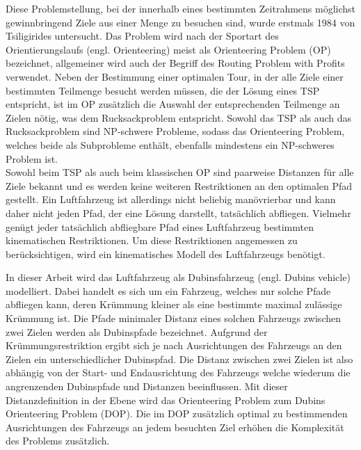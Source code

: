 \documentclass[12pt,a4paper,twoside]{article}
\theoremstyle{definition}
\numberwithin{equation}{section}
\begin{document}
Diese Problemstellung, bei der innerhalb eines bestimmten Zeitrahmens möglichst gewinnbringend Ziele aus einer Menge zu besuchen sind, wurde erstmals 1984 von Tsiligirides \cite{Tsiligirides.1984} untersucht. Das Problem wird nach der Sportart des Orientierungslaufs (engl. Orienteering) meist als Orienteering Problem (OP) bezeichnet, allgemeiner wird auch der Begriff des Routing Problem with Profits \cite{Vansteenwegen.2019} verwendet.
Neben der Bestimmung einer optimalen Tour, in der alle Ziele einer bestimmten Teilmenge besucht werden müssen, die der Lösung eines TSP entspricht, ist im OP zusätzlich die Auswahl der entsprechenden Teilmenge an Zielen nötig, was dem Rucksackproblem entspricht. Sowohl das TSP als auch das Rucksackproblem sind NP-schwere Probleme, sodass das Orienteering Problem, welches beide als Subprobleme enthält, ebenfalls mindestens ein NP-schweres Problem ist.\\

Sowohl beim TSP als auch beim klassischen OP sind paarweise Distanzen für alle Ziele bekannt und es werden keine weiteren Restriktionen an den optimalen Pfad gestellt. Ein Luftfahrzeug ist allerdings nicht beliebig manövrierbar und kann daher nicht jeden Pfad, der eine Lösung darstellt, tatsächlich abfliegen. Vielmehr genügt jeder tatsächlich abfliegbare Pfad eines Luftfahrzeug bestimmten kinematischen Restriktionen. Um diese Restriktionen angemessen zu berücksichtigen, wird ein kinematisches Modell des Luftfahrzeugs benötigt. 

In dieser Arbeit wird das Luftfahrzeug als Dubinsfahrzeug (engl. Dubins vehicle) \cite{Dubins.1957} modelliert. Dabei handelt es sich um ein Fahrzeug, welches nur solche Pfade abfliegen kann, deren Krümmung kleiner als eine bestimmte maximal zulässige Krümmung ist. Die Pfade minimaler Distanz eines solchen Fahrzeugs zwischen zwei Zielen werden als Dubinspfade bezeichnet. Aufgrund der Krümmungsrestriktion ergibt sich je nach Ausrichtungen des Fahrzeugs an den Zielen ein unterschiedlicher Dubinspfad. Die Distanz zwischen zwei Zielen ist also abhängig von der Start- und Endausrichtung des Fahrzeugs welche wiederum die angrenzenden Dubinspfade und Distanzen beeinflussen. Mit dieser Distanzdefinition in der Ebene wird das Orienteering Problem zum Dubins Orienteering Problem (DOP). Die im DOP zusätzlich optimal zu bestimmenden  Ausrichtungen des Fahrzeugs an jedem besuchten Ziel erhöhen die Komplexität des Problems zusätzlich.

\end{document}
